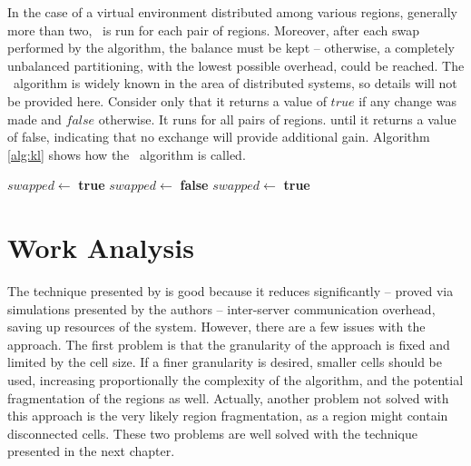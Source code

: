 In the case of a virtual environment distributed among various regions, generally more than two, \kl\ is run for each pair of regions. Moreover, after each swap performed by the algorithm, the balance must be kept -- otherwise, a completely unbalanced partitioning, with the lowest possible overhead, could be reached. The \kl\ algorithm is widely known in the area of distributed systems, so details will not be provided here. Consider only that it returns a value of $true$ if any change was made and $false$ otherwise. It runs for all pairs of regions. until it returns a value of false, indicating that no exchange will provide additional gain. Algorithm \ref{alg:kl} shows how the \kl\ algorithm is called.


\begin{algorithm}
\caption{\kl}
\label{alg:kl}
\begin{algorithmic}[1]

	\STATE $swapped \leftarrow$ \textbf{true}
		\STATE $swapped \leftarrow$ \textbf{false}
					\STATE $swapped \leftarrow$ \textbf{true}
				\ENDIF
			\ENDFOR
		\ENDFOR
	\ENDWHILE

\end{algorithmic}
\end{algorithm}



\section{Work Analysis}

The technique presented by \cite{bezerra2009lbs} is good because it reduces significantly -- proved via simulations presented by the authors -- inter-server communication overhead, saving up resources of the system. However, there are a few issues with the approach. The first problem is that the granularity of the approach is fixed and limited by the cell size. If a finer granularity is desired, smaller cells should be used, increasing proportionally the complexity of the algorithm, and the potential fragmentation of the regions as well. Actually, another problem not solved with this approach is the very likely region fragmentation, as a region might contain disconnected cells. These two problems are well solved with the technique presented in the next chapter.